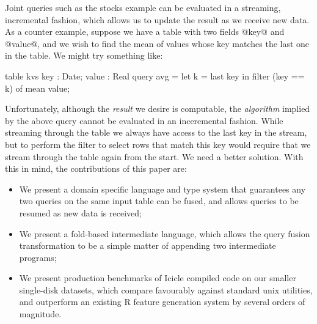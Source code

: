 Joint queries such as the stocks example can be evaluated in a streaming, incremental fashion, which allows us to update the result as we receive new data. As a counter example, suppose we have a table with two fields @key@ and @value@, and we wish to find the mean of values whose key matches the last one in the table. We might try something like:
\begin{code}
  table kvs { key : Date; value : Real }
  query avg = let k = last key
              in  filter (key == k) of mean value;
\end{code}
Unfortunately, although the \emph{result} we desire is computable, the \emph{algorithm} implied by the above query cannot be evaluated in an inceremental fashion. While streaming through the table we always have access to the last key in the stream, but to perform the filter to select rows that match this key would require that we stream through the table again from the start. We need a better solution. With this in mind, the contributions of this paper are:
\begin{itemize}
\item
We present a domain specific language and type system that guarantees any two queries on the same input table can be fused, and allows queries to be resumed as new data is received;

\item
We present a fold-based intermediate language, which allows the query fusion transformation to be a simple matter of appending two intermediate programs;

\item
We present production benchmarks of Icicle compiled code on our smaller single-disk datasets, which compare favourably against standard unix utilities, and outperform an existing R feature generation system by several orders of magnitude.
\end{itemize}



